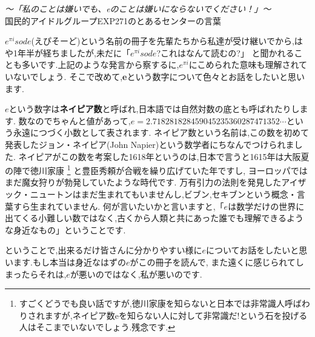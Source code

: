


\begin{flushright}
\textit {〜「私のことは嫌いでも、eのことは嫌いにならないでください！」〜}\\
国民的アイドルグループEXP271のとあるセンターの言葉
\end{flushright}

$e^{\pi i}sode$(えぴそーど)という名前の冊子を先輩たちから私達が受け継いでから,はや1年半が経ちましたが,未だに「$e^{\pi i}sode$?これはなんて読むの?」
と聞かれることも多いです.上記のような発言から察するに,$e^{\pi i}$にこめられた意味も理解されていないでしょう.
そこで改めて,{\bf e}という数字について色々とお話をしたいと思います.\par
$e$という数字は{\bf ネイピア数}と呼ばれ,日本語では自然対数の底とも呼ばれたりします.
数なのでちゃんと値があって,$e = 2.718281828459045235360287471352\cdots$という永遠につづく小数として表されます.
ネイピア数という名前は,この数を初めて発表したジョン・ネイピア(John Napier)という数学者にちなんでつけられました.
ネイピアがこの数を考案した1618年というのは,日本で言うと1615年は大阪夏の陣で徳川家康
\footnote{すごくどうでも良い話ですが,徳川家康を知らないと日本では非常識人呼ばわりされますが,ネイピア数eを知らない人に対して非常識だ!という石を投げる人はそこまでいないでしょう.残念です.} と豊臣秀頼が合戦を繰り広げていた年ですし,
ヨーロッパではまだ魔女狩りが勃発していたような時代です.
万有引力の法則を発見したアイザック・ニュートンはまだ生まれてもいませんし,ビブン,セキブンという概念・言葉すら生まれていません.
何が言いたいかと言いますと,「$e$は数学だけの世界に出てくる小難しい数ではなく,古くから人類と共にあった誰でも理解できるような身近なもの」ということです.\par
ということで,出来るだけ皆さんに分かりやすい様に$e$についてお話をしたいと思います.もし本当は身近なはずの$e$がこの冊子を読んで,
また遠くに感じられてしまったらそれは,$e$が悪いのではなく,私が悪いのです.

